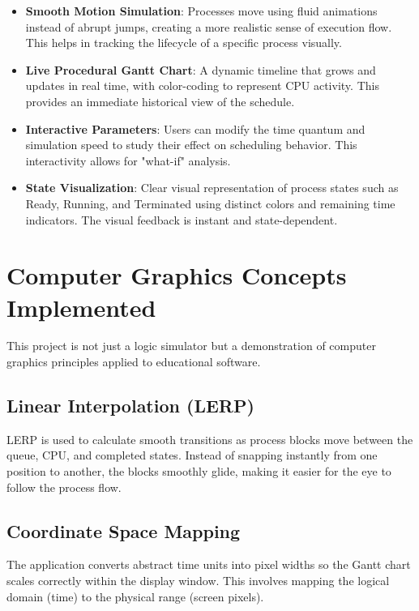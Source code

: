 \documentclass[12pt, a4paper]{report}
\begin{document}
\begin{itemize}
    \item \textbf{Smooth Motion Simulation}: Processes move using fluid animations instead of abrupt jumps, creating a more realistic sense of execution flow. This helps in tracking the lifecycle of a specific process visually.
    
    \item \textbf{Live Procedural Gantt Chart}: A dynamic timeline that grows and updates in real time, with color-coding to represent CPU activity. This provides an immediate historical view of the schedule.
    
    \item \textbf{Interactive Parameters}: Users can modify the time quantum and simulation speed to study their effect on scheduling behavior. This interactivity allows for "what-if" analysis.
    
    \item \textbf{State Visualization}: Clear visual representation of process states such as Ready, Running, and Terminated using distinct colors and remaining time indicators. The visual feedback is instant and state-dependent.
\end{itemize}

\chapter{Computer Graphics Concepts Implemented}

This project is not just a logic simulator but a demonstration of computer graphics principles applied to educational software.

\section{Linear Interpolation (LERP)}
LERP is used to calculate smooth transitions as process blocks move between the queue, CPU, and completed states. Instead of snapping instantly from one position to another, the blocks smoothly glide, making it easier for the eye to follow the process flow.

\section{Coordinate Space Mapping}
The application converts abstract time units into pixel widths so the Gantt chart scales correctly within the display window. This involves mapping the logical domain (time) to the physical range (screen pixels).
\end{document}
